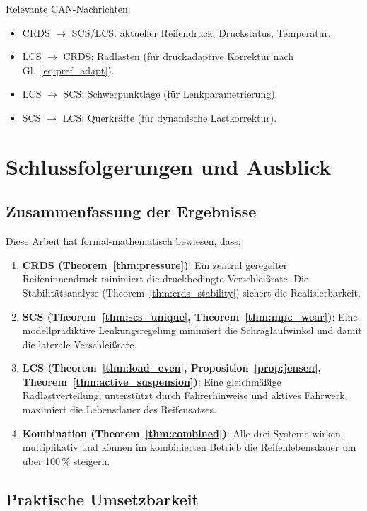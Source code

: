 ﻿\documentclass[12pt,a4paper]{article}
\theoremstyle{definition}
\theoremstyle{remark}
\begin{document}
Relevante CAN-Nachrichten:
\begin{itemize}
  \item CRDS $\to$ SCS/LCS: aktueller Reifendruck, Druckstatus, Temperatur.
  \item LCS $\to$ CRDS: Radlasten (für druckadaptive Korrektur nach Gl.~\eqref{eq:pref_adapt}).
  \item LCS $\to$ SCS: Schwerpunktlage (für Lenkparametrierung).
  \item SCS $\to$ LCS: Querkräfte (für dynamische Lastkorrektur).
\end{itemize}

\section{Schlussfolgerungen und Ausblick}
\label{sec:schluss}

\subsection{Zusammenfassung der Ergebnisse}

Diese Arbeit hat formal-mathematisch bewiesen, dass:

\begin{enumerate}
  \item \textbf{CRDS (Theorem~\ref{thm:pressure})}: Ein zentral geregelter
        Reifeninnendruck minimiert die druckbedingte Verschleißrate.
        Die Stabilitätsanalyse (Theorem~\ref{thm:crds_stability}) sichert
        die Realisierbarkeit.
  \item \textbf{SCS (Theorem~\ref{thm:scs_unique}, Theorem~\ref{thm:mpc_wear})}:
        Eine modellprädiktive Lenkungsregelung minimiert die Schräglaufwinkel
        und damit die laterale Verschleißrate.
  \item \textbf{LCS (Theorem~\ref{thm:load_even}, Proposition~\ref{prop:jensen},
        Theorem~\ref{thm:active_suspension})}: Eine gleichmäßige Radlastverteilung,
        unterstützt durch Fahrerhinweise und aktives Fahrwerk, maximiert die
        Lebensdauer des Reifensatzes.
  \item \textbf{Kombination (Theorem~\ref{thm:combined})}: Alle drei Systeme
        wirken multiplikativ und können im kombinierten Betrieb die Reifenlebensdauer
        um über 100\,\% steigern.
\end{enumerate}

\subsection{Praktische Umsetzbarkeit}
\end{document}
